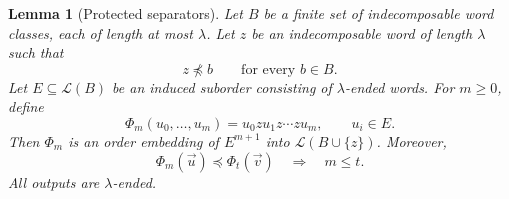 \documentclass[11pt,letterpaper]{article}
\newtheorem{lemma}[lemma]{Lemma}
\theoremstyle{definition}
\theoremstyle{remark}
\newcommand{\Lcal}{\mathcal L}
\newcommand{\emb}{\preccurlyeq}
\newcommand{\nemb}{\npreccurlyeq}
\begin{document}
\begin{lemma}[Protected separators]\label{lem:separator}
Let $B$ be a finite set of indecomposable word classes, each of length at
most $\lambda$. Let $z$ be an indecomposable word of length $\lambda$ such that
\begin{equation}\label{eq:separatorcondition}
  z\nemb b\qquad\text{for every }b\in B.
\end{equation}
Let $E\subseteq\Lcal(B)$ be an induced suborder consisting of
$\lambda$-ended words. For $m\ge0$, define
\begin{equation}\label{eq:separator-map}
  \Phi_m(u_0,\ldots,u_m)=u_0 z u_1 z\cdots z u_m,
  \qquad u_i\in E.
\end{equation}
Then $\Phi_m$ is an order embedding of $E^{m+1}$ into
$\Lcal(B\cup\{z\})$. Moreover,
\begin{equation}\label{eq:separatorcount}
  \Phi_m(\vec u)\emb\Phi_t(\vec v)\quad\Longrightarrow\quad m\le t.
\end{equation}
All outputs are $\lambda$-ended.
\end{lemma}
\end{document}
